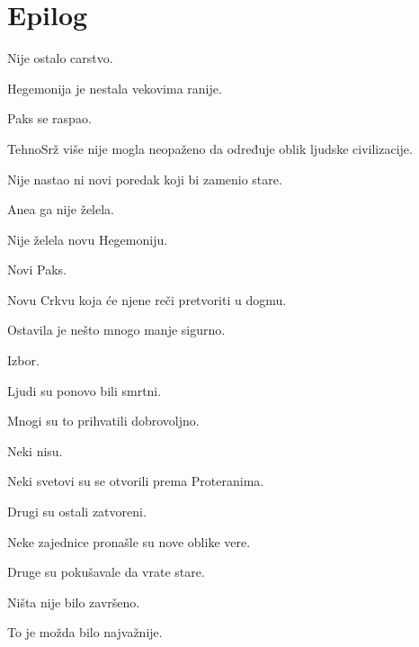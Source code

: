 
\chapter{Epilog}


Nije ostalo carstvo.

\bigskip

Hegemonija je nestala vekovima ranije.

Paks se raspao.

TehnoSrž više nije mogla neopaženo da određuje oblik ljudske civilizacije.

\bigskip

Nije nastao ni novi poredak koji bi zamenio stare.

\bigskip

Anea ga nije želela.

\bigskip

Nije želela novu Hegemoniju.

Novi Paks.

Novu Crkvu koja će njene reči pretvoriti u dogmu.

\bigskip

Ostavila je nešto mnogo manje sigurno.

\bigskip

Izbor.

\bigskip

Ljudi su ponovo bili smrtni.

\bigskip

Mnogi su to prihvatili dobrovoljno.

\bigskip

Neki nisu.

\bigskip

Neki svetovi su se otvorili prema Proteranima.

Drugi su ostali zatvoreni.

\bigskip

Neke zajednice pronašle su nove oblike vere.

Druge su pokušavale da vrate stare.

\bigskip

Ništa nije bilo završeno.

\bigskip

To je možda bilo najvažnije.

\bigskip

